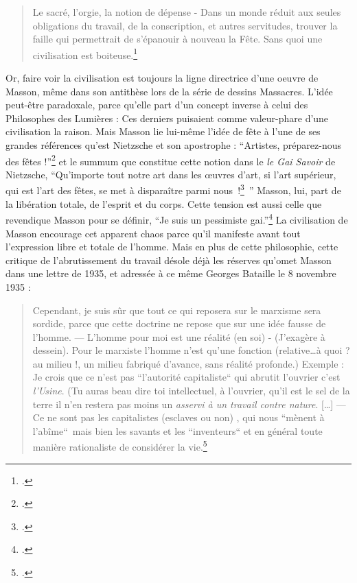 \begin{quote}
Le sacré, l’orgie, la notion de dépense - Dans un monde réduit aux seules obligations du travail, de la conscription, et autres servitudes, trouver la faille qui permettrait de s’épanouir à nouveau la Fête. Sans quoi une civilisation est boiteuse.\footcite[p74]{rebelle}
\end{quote}

	Or, faire voir la civilisation est toujours la ligne directrice d’une oeuvre de Masson, même dans son antithèse lors de la série de dessins Massacres. L’idée peut-être paradoxale, parce qu’elle part d’un concept inverse à celui des Philosophes des Lumières : Ces derniers puisaient comme valeur-phare d’une civilisation la raison. Mais Masson lie lui-même l’idée de fête à l’une de ses grandes références qu’est Nietzsche  et son apostrophe  : \enquote{Artistes, préparez-nous des fêtes !}\footcite[p39]{memoiremonde} et le summum que constitue cette notion dans le \emph{le Gai Savoir} de Nietzsche, \enquote{Qu’importe tout notre art dans les œuvres d’art, si l’art supérieur, qui est l’art des fêtes, se met à disparaître parmi nous !\footcite[]{nietzsche} }
	Masson, lui, part de la libération totale, de l’esprit et du corps. Cette tension est aussi celle que revendique Masson pour se définir, \enquote{Je suis un pessimiste gai.}\footcite[p. 8]{memoiremonde} La civilisation de Masson encourage cet apparent chaos parce qu’il manifeste avant tout l’expression libre et totale de l’homme. Mais en plus de cette philosophie, cette critique de l’abrutissement du travail désole déjà les réserves qu’omet Masson dans une lettre de 1935, et adressée à ce même Georges Bataille le 8 novembre 1935 :
	
\begin{quote}Cependant, je suis sûr que tout ce qui reposera sur le marxisme sera sordide, parce que cette doctrine ne repose que sur une idée fausse de l’homme. — L’homme pour moi est une réalité (en soi) - (J’exagère à dessein). Pour le marxiste l’homme n’est qu’une fonction (relative…à quoi ? au milieu !, un milieu fabriqué d’avance, sans réalité profonde.) Exemple : Je crois que ce n’est pas “l’autorité capitaliste“ qui abrutit l’ouvrier c’est \emph{l’Usine}. (Tu auras beau dire toi intellectuel, à l’ouvrier, qu’il est le sel de la terre il n’en restera pas moins un \emph{asservi à un travail contre nature}. […] — Ce ne sont pas les capitalistes (esclaves ou non) , qui nous “mènent à l’abîme“ mais bien les savants et les “inventeurs“ et en général toute manière rationaliste de considérer la vie.\footcite[p292]{anneessurrealistes}\end{quote}

